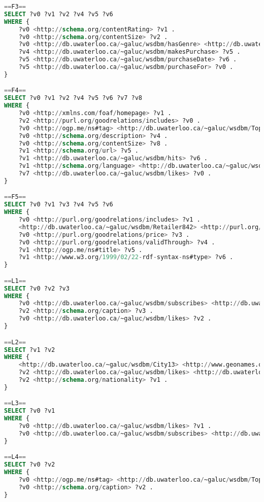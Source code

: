 \begin{lstlisting}[language=SQL, basicstyle=\ttfamily\scriptsize,morekeywords={PREFIX,OPTIONAL,FILTER,java,rdf,rdfs,url},breaklines=true,showstringspaces=false,label=watdiv-sparql-queries,basewidth=0.5em]
==F3==
SELECT ?v0 ?v1 ?v2 ?v4 ?v5 ?v6 
WHERE {
    ?v0 <http://schema.org/contentRating> ?v1 .
    ?v0 <http://schema.org/contentSize> ?v2 .
    ?v0 <http://db.uwaterloo.ca/~galuc/wsdbm/hasGenre> <http://db.uwaterloo.ca/~galuc/wsdbm/SubGenre60> .
    ?v4 <http://db.uwaterloo.ca/~galuc/wsdbm/makesPurchase> ?v5 .
    ?v5 <http://db.uwaterloo.ca/~galuc/wsdbm/purchaseDate> ?v6 .
    ?v5 <http://db.uwaterloo.ca/~galuc/wsdbm/purchaseFor> ?v0 .
}

==F4==
SELECT ?v0 ?v1 ?v2 ?v4 ?v5 ?v6 ?v7 ?v8
WHERE {
    ?v0 <http://xmlns.com/foaf/homepage> ?v1 .
    ?v2 <http://purl.org/goodrelations/includes> ?v0 .
    ?v0 <http://ogp.me/ns#tag> <http://db.uwaterloo.ca/~galuc/wsdbm/Topic13> .
    ?v0 <http://schema.org/description> ?v4 .
    ?v0 <http://schema.org/contentSize> ?v8 .
    ?v1 <http://schema.org/url> ?v5 .
    ?v1 <http://db.uwaterloo.ca/~galuc/wsdbm/hits> ?v6 .
    ?v1 <http://schema.org/language> <http://db.uwaterloo.ca/~galuc/wsdbm/Language0> .
    ?v7 <http://db.uwaterloo.ca/~galuc/wsdbm/likes> ?v0 .
}

==F5==
SELECT ?v0 ?v1 ?v3 ?v4 ?v5 ?v6 
WHERE {
    ?v0 <http://purl.org/goodrelations/includes> ?v1 .
    <http://db.uwaterloo.ca/~galuc/wsdbm/Retailer842> <http://purl.org/goodrelations/offers> ?v0 .
    ?v0 <http://purl.org/goodrelations/price> ?v3 .
    ?v0 <http://purl.org/goodrelations/validThrough> ?v4 .
    ?v1 <http://ogp.me/ns#title> ?v5 .
    ?v1 <http://www.w3.org/1999/02/22-rdf-syntax-ns#type> ?v6 .
}

==L1==
SELECT ?v0 ?v2 ?v3 
WHERE {
    ?v0 <http://db.uwaterloo.ca/~galuc/wsdbm/subscribes> <http://db.uwaterloo.ca/~galuc/wsdbm/Website16661> .
    ?v2 <http://schema.org/caption> ?v3 .
    ?v0 <http://db.uwaterloo.ca/~galuc/wsdbm/likes> ?v2 .
}

==L2==
SELECT ?v1 ?v2 
WHERE {
    <http://db.uwaterloo.ca/~galuc/wsdbm/City13> <http://www.geonames.org/ontology#parentCountry> ?v1 .
    ?v2 <http://db.uwaterloo.ca/~galuc/wsdbm/likes> <http://db.uwaterloo.ca/~galuc/wsdbm/Product0> .
    ?v2 <http://schema.org/nationality> ?v1 .
}

==L3==
SELECT ?v0 ?v1 
WHERE {
    ?v0 <http://db.uwaterloo.ca/~galuc/wsdbm/likes> ?v1 .
    ?v0 <http://db.uwaterloo.ca/~galuc/wsdbm/subscribes> <http://db.uwaterloo.ca/~galuc/wsdbm/Website2633> .
}

==L4==
SELECT ?v0 ?v2 
WHERE {
    ?v0 <http://ogp.me/ns#tag> <http://db.uwaterloo.ca/~galuc/wsdbm/Topic96> .
    ?v0 <http://schema.org/caption> ?v2 .
}


\end{lstlisting}
